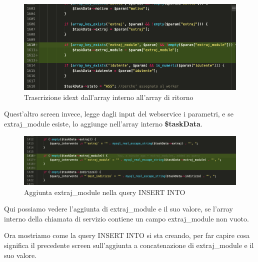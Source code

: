 \newspace
\begin{figure}[!h] 
	\centering
	\includegraphics[scale = 0.5]{immagini/webservices/ampliamenti/2ampl-insert-extraj_mokers__funzione-mokersNewActivity.png}
	\caption{Trascrizione idext dall'array interno all'array di ritorno}
\end{figure}
\newspace
\begin{flushleft}
	
	Quest'altro screen invece, legge dagli input del webservice i parametri, e se extraj\_module esiste, lo aggiunge nell'array interno \textbf{\$taskData}.
	
\end{flushleft}
\newspace
\begin{figure}[!h] 
	\centering
	\includegraphics[scale = 0.5]{immagini/webservices/ampliamenti/2ampl_added-extraj_modules-as-query.png}
	\caption{Aggiunta extraj\_module nella query INSERT INTO}
\end{figure}
\newspace

\begin{flushleft}
	Qui possiamo vedere l'aggiunta di extraj\_module e il suo valore, se l'array interno della chiamata di servizio contiene un campo extraj\_module non vuoto.
\end{flushleft}

\newpage

\begin{flushleft}
	Ora mostriamo come la query INSERT INTO si sta creando, per far capire cosa significa il precedente screen sull'aggiunta a concatenazione di extraj\_module e il suo valore.
\end{flushleft}

